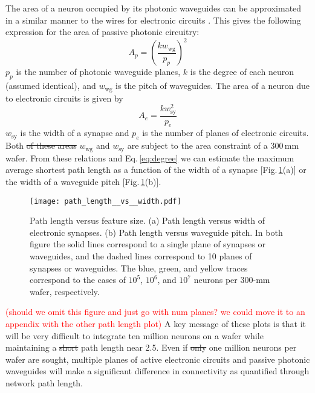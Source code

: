 \documentclass[twocolumn]{article}
\begin{document}
The area of a neuron occupied by its photonic waveguides can be approximated in a similar manner to the wires for electronic circuits \cite{ke1982}. This gives the following expression for the area of passive photonic circuitry:
\begin{equation}
\label{eq:area_p}
A_p = \left( \frac{k w_{\mathrm{wg}}}{p_p} \right)^2
\end{equation}
$p_p$ is the number of photonic waveguide planes, $k$ is the degree of each neuron (assumed identical), and $w_{\mathrm{wg}}$ is the pitch of waveguides. The area of a neuron due to electronic circuits is given by
\begin{equation}
\label{eq:area_e}
A_e = \frac{k w_{\mathrm{sy}}^2}{p_e}
\end{equation}
$w_{\mathrm{sy}}$ is the width of a synapse and $p_e$ is the number of planes of electronic circuits. Both \sout{of these areas} $w_{\mathrm{wg}}$ and $w_{\mathrm{sy}}$ are subject to the area constraint of a 300\,mm wafer. From these relations and Eq.\,\ref{eq:degree} we can estimate the maximum average shortest path length as a function of the width of a synapse [Fig.\,\ref{fig:path_length__vs__width}(a)] or the width of a waveguide pitch [Fig.\,\ref{fig:path_length__vs__width}(b)]. 
\begin{figure}[!h]
    \centering
    \texttt{[image: path\_length\_\_vs\_\_width.pdf]}
    \caption{Path length versus feature size. (a) Path length versus width of electronic synapses. (b) Path length versus waveguide pitch. In both figure the solid lines correspond to a single plane of synapses or waveguides, and the dashed lines correspond to 10 planes of synapses or waveguides. The blue, green, and yellow traces correspond to the cases of $10^5$, $10^6$, and $10^7$ neurons per 300-mm wafer, respectively.}
    \label{fig:path_length__vs__width}
\end{figure}
\textcolor{red}{(should we omit this figure and just go with num planes? we could move it to an appendix with the other path length plot)}
A key message of these plots is that it will be very difficult to integrate ten million neurons on a wafer while maintaining a \sout{short} path length near 2.5. Even if \sout{only} one million neurons per wafer are sought, multiple planes of active electronic circuits and passive photonic waveguides will make a significant difference in connectivity as quantified through network path length.
\end{document}
